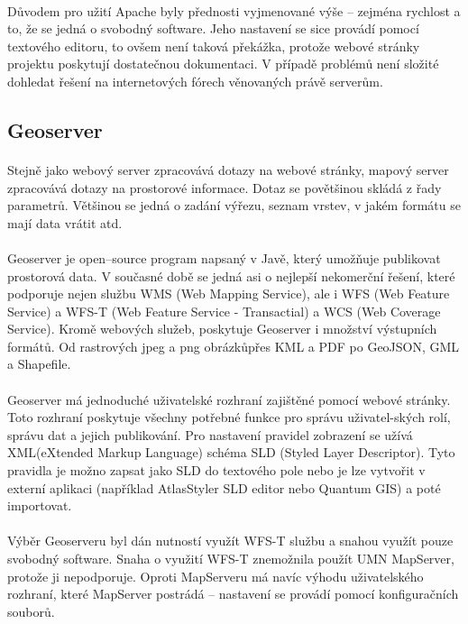 \documentclass[11pt,a4paper,titlepage,oneside]{book}
\begin{document}
			\paragraph{} Důvodem pro užití Apache byly přednosti vyjmenované výše -- zejména rychlost a to, že se jedná o svobodný software. Jeho nastavení se sice provádí pomocí textového editoru, to ovšem není taková překážka, protože webové stránky projektu poskytují dostatečnou dokumentaci. V případě problémů není složité dohledat řešení na internetových fórech věnovaných právě serverům.

		\subsection{Geoserver}
			\paragraph{} Stejně jako webový server zpracovává dotazy na webové stránky, mapový server zpracovává dotazy na prostorové informace. Dotaz se povětšinou skládá z řady parametrů. Většinou se jedná o zadání výřezu, seznam vrstev, v jakém formátu se mají data vrátit atd. 
			\paragraph{} Geoserver je open--source program napsaný v Javě, který umožňuje publikovat prostorová data. V současné době se jedná asi o nejlepší nekomerční řešení\cite{vorlicek}, které podporuje nejen službu WMS (Web Mapping Service), ale i WFS (Web Feature Service) a WFS-T (Web Feature Service - Transactial) a WCS (Web Coverage Service). Kromě webových služeb, poskytuje Geoserver i množství výstupních formátů. Od rastrových jpeg a png obrázkůpřes KML a PDF po GeoJSON, GML a Shapefile.
			\paragraph{} Geoserver má jednoduché uživatelské rozhraní zajištěné pomocí webové stránky. Toto rozhraní poskytuje všechny potřebné funkce pro správu uživatel-ských rolí, správu dat a jejich publikování. Pro nastavení pravidel zobrazení se užívá XML(eXtended Markup Language) schéma SLD (Styled Layer Descriptor). Tyto pravidla je možno zapsat jako SLD do textového pole nebo je lze vytvořit v externí aplikaci (například AtlasStyler SLD editor\cite{atlas} nebo Quantum GIS\cite{qgis}) a poté importovat.
			\paragraph{} Výběr Geoserveru byl dán nutností využít WFS-T službu a snahou využít pouze svobodný software. Snaha o využití WFS-T znemožnila použít UMN MapServer, protože ji nepodporuje. Oproti MapServeru má navíc výhodu uživatelského rozhraní, které MapServer postrádá -- nastavení se provádí pomocí konfiguračních souborů.
\end{document}
